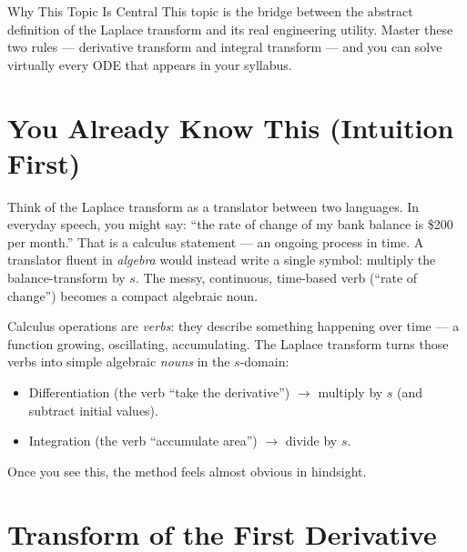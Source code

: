 \documentclass[12pt,a4paper]{article}
\begin{document}
\begin{learnbox}{Why This Topic Is Central}
This topic is the bridge between the abstract definition of the Laplace transform and its
real engineering utility.
Master these two rules --- derivative transform and integral transform --- and you can solve
virtually every ODE that appears in your syllabus.
\end{learnbox}

\section{You Already Know This (Intuition First)}

Think of the Laplace transform as a translator between two languages.
In everyday speech, you might say: ``the rate of change of my bank balance is \$200 per month.''
That is a calculus statement --- an ongoing process in time.
A translator fluent in \emph{algebra} would instead write a single symbol: multiply the
balance-transform by \(s\).
The messy, continuous, time-based verb (``rate of change'') becomes a compact algebraic noun.

Calculus operations are \emph{verbs}: they describe something happening over time ---
a function growing, oscillating, accumulating.
The Laplace transform turns those verbs into simple algebraic \emph{nouns} in the \(s\)-domain:
\begin{itemize}
  \item Differentiation (the verb ``take the derivative'') $\longrightarrow$ multiply by \(s\) (and subtract initial values).
  \item Integration (the verb ``accumulate area'') $\longrightarrow$ divide by \(s\).
\end{itemize}
Once you see this, the method feels almost obvious in hindsight.

\section{Transform of the First Derivative}
\end{document}
